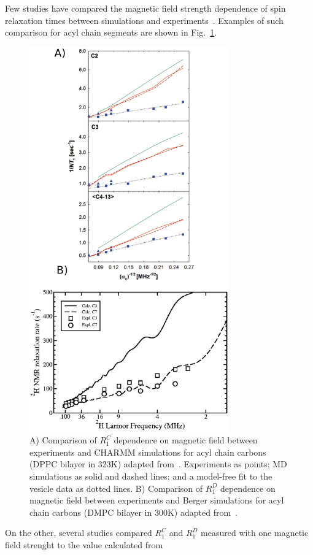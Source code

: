 \documentclass[aps,prl,superscriptaddress,twocolumn]{revtex4}
\begin{document}
Few studies have compared the magnetic field strength dependence of spin relaxation times between simulations and
experiments~\cite{lindahl01,klauda08a,klauda08b,wohlert06}. Examples of such comparison for acyl chain segments are shown in Fig.~\ref{Rdispersion}.
\begin{figure}[]
  \includegraphics[width=8.6cm]{../Fig/Rdispersion.eps}
\newline
  \caption{\label{Rdispersion}
    A) Comparison of $R_1^{C}$ dependence on magnetic field between experiments and CHARMM simulations for acyl chain carbons (DPPC bilayer in 323K) adapted from~\cite{klauda08a}.
    Experiments as points; MD simulations as solid and dashed lines; and a model-free fit to the vesicle data as dotted lines. 
    B) Comparison of $R_1^{D}$ dependence on magnetic field between experiments and Berger simulations for acyl chain carbons (DMPC bilayer in 300K) adapted from~\cite{wohlert06}.
  } 
\end{figure}
On the other, several studies compared $R_1^{C}$ and $R_1^{D}$ measured with one magnetic field strenght to the value calculated from
\end{document}
